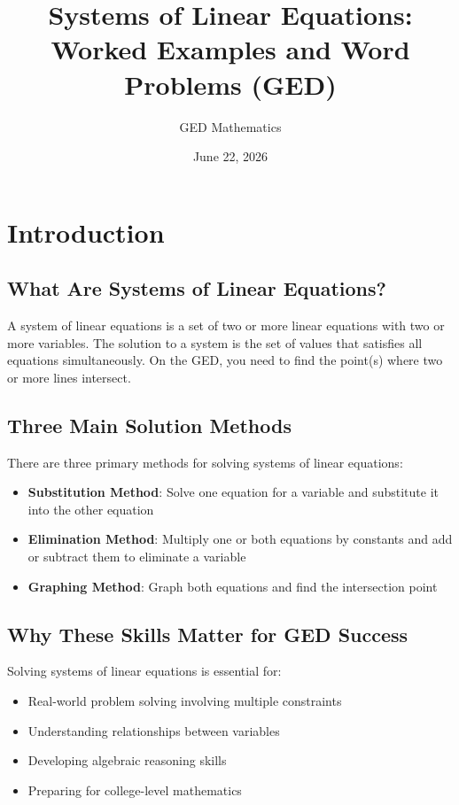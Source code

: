 \documentclass{article}
\title{Systems of Linear Equations: Worked Examples and Word Problems (GED)}
\author{GED Mathematics}
\date{June 22, 2026}
\begin{document}
\maketitle

\section{Introduction}

\subsection{What Are Systems of Linear Equations?}

A system of linear equations is a set of two or more linear equations with two or more variables. The solution to a system is the set of values that satisfies all equations simultaneously. On the GED, you need to find the point(s) where two or more lines intersect.

\subsection{Three Main Solution Methods}

There are three primary methods for solving systems of linear equations:

\begin{itemize}
    \item \textbf{Substitution Method}: Solve one equation for a variable and substitute it into the other equation
    \item \textbf{Elimination Method}: Multiply one or both equations by constants and add or subtract them to eliminate a variable
    \item \textbf{Graphing Method}: Graph both equations and find the intersection point
\end{itemize}

\subsection{Why These Skills Matter for GED Success}

Solving systems of linear equations is essential for:

\begin{itemize}
    \item Real-world problem solving involving multiple constraints
    \item Understanding relationships between variables
    \item Developing algebraic reasoning skills
    \item Preparing for college-level mathematics
\end{itemize}
\end{document}
